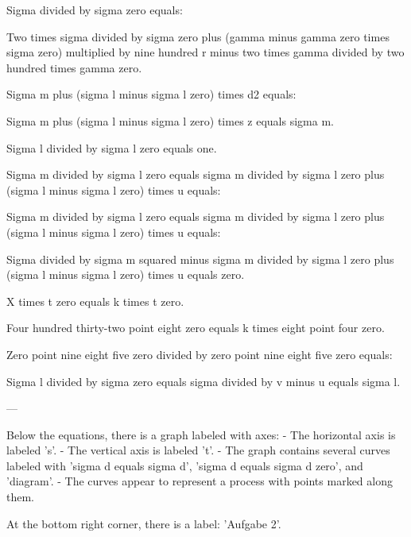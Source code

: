 Sigma divided by sigma zero equals:  

Two times sigma divided by sigma zero plus (gamma minus gamma zero times sigma zero) multiplied by nine hundred r minus two times gamma divided by two hundred times gamma zero.  

Sigma m plus (sigma l minus sigma l zero) times d2 equals:  

Sigma m plus (sigma l minus sigma l zero) times z equals sigma m.  

Sigma l divided by sigma l zero equals one.  

Sigma m divided by sigma l zero equals sigma m divided by sigma l zero plus (sigma l minus sigma l zero) times u equals:  

Sigma m divided by sigma l zero equals sigma m divided by sigma l zero plus (sigma l minus sigma l zero) times u equals:  

Sigma divided by sigma m squared minus sigma m divided by sigma l zero plus (sigma l minus sigma l zero) times u equals zero.  

X times t zero equals k times t zero.  

Four hundred thirty-two point eight zero equals k times eight point four zero.  

Zero point nine eight five zero divided by zero point nine eight five zero equals:  

Sigma l divided by sigma zero equals sigma divided by v minus u equals sigma l.  

---

Below the equations, there is a graph labeled with axes:  
- The horizontal axis is labeled 's'.  
- The vertical axis is labeled 't'.  
- The graph contains several curves labeled with 'sigma d equals sigma d', 'sigma d equals sigma d zero', and 'diagram'.  
- The curves appear to represent a process with points marked along them.  

At the bottom right corner, there is a label:  
'Aufgabe 2'.